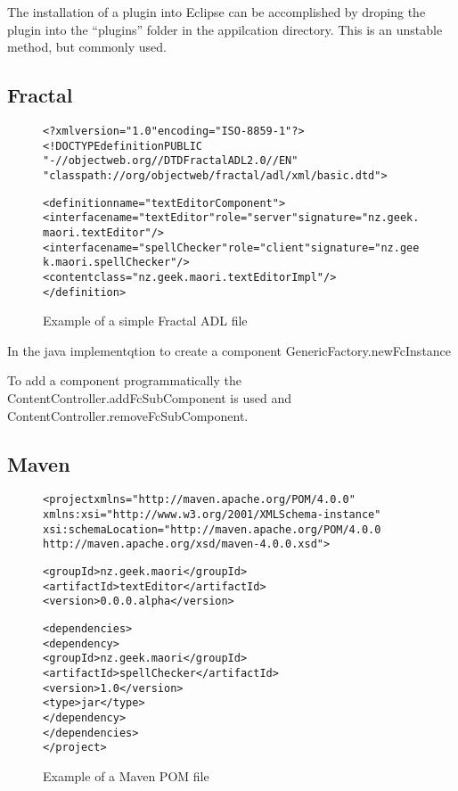 The installation of a plugin into Eclipse can be accomplished by droping the plugin into the ``plugins'' folder in the appilcation directory.
This is an unstable method, but commonly used.

\subsection{Fractal}

\begin{figure}[htp]
\begin{center}
\begin{alltt}
<?xml version="1.0" encoding="ISO-8859-1" ?>
<!DOCTYPE definition PUBLIC 
    "-//objectweb.org//DTD Fractal ADL 2.0//EN" 
    "classpath://org/objectweb/fractal/adl/xml/basic.dtd">

<definition name="textEditorComponent">
  <interface name="textEditor" role="server" signature="nz.geek.maori.textEditor"/>
  <interface name="spellChecker" role="client" signature="nz.geek.maori.spellChecker"/>
  <content class="nz.geek.maori.textEditorImpl"/>
</definition>
\end{alltt}
  \caption[Fractal ADL Example]{Example of a simple Fractal ADL file}
  \label{osgibundle}
\end{center}
\end{figure}


In the java implementqtion to create a component GenericFactory.newFcInstance

To add a component programmatically the ContentController.addFcSubComponent is used and ContentController.removeFcSubComponent.



\subsection{Maven}

\begin{figure}[htp]
\begin{center}
\begin{alltt}
<project xmlns="http://maven.apache.org/POM/4.0.0"
  xmlns:xsi="http://www.w3.org/2001/XMLSchema-instance"
  xsi:schemaLocation="http://maven.apache.org/POM/4.0.0
                      http://maven.apache.org/xsd/maven-4.0.0.xsd">

  <groupId>nz.geek.maori</groupId>
  <artifactId>textEditor</artifactId>
  <version>0.0.0.alpha</version>

    <dependencies>
        <dependency>
          <groupId>nz.geek.maori</groupId>
          <artifactId>spellChecker</artifactId>
          <version>1.0</version>
          <type>jar</type>
        </dependency>
  </dependencies>
</project>
\end{alltt}
  \caption[Maven POM file]{Example of a Maven POM file}
  \label{osgibundle}
\end{center}
\end{figure}

